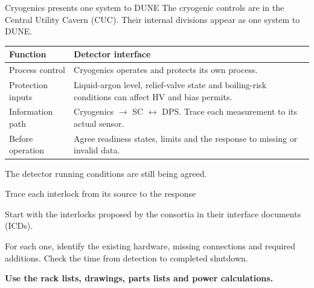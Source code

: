 \documentclass[aspectratio=169,11pt]{beamer}
\begin{document}
\DpsSdstaUpdate

\begin{frame}{Cryogenics presents one system to DUNE}
The cryogenic controls are in the Central Utility Cavern (CUC).
Their internal divisions appear as one system to DUNE.\par\bigskip
\renewcommand{\arraystretch}{1.3}
\begin{tabularx}{\textwidth}{@{}>{\RaggedRight\arraybackslash}p{3cm}>{\RaggedRight\arraybackslash}X@{}}
\toprule
\textbf{Function} & \textbf{Detector interface}\\\midrule
Process control & Cryogenics operates and protects its own process.\\
Protection inputs & Liquid-argon level, relief-valve state and boiling-risk conditions can affect HV and bias permits.\\
Information path & Cryogenics $\rightarrow$ SC $\leftrightarrow$ DPS. Trace each measurement to its actual sensor.\\
Before operation & Agree readiness states, limits and the response to missing or invalid data.\\
\bottomrule
\end{tabularx}\par\medskip
The detector running conditions are still being agreed.
\end{frame}

\begin{frame}{Trace each interlock from its source to the response}
\centering
{}\par\smallskip
\raggedright{}\par\smallskip
\raggedright

Start with the interlocks proposed by the consortia in their interface documents (ICDs).\par\bigskip
For each one, identify the existing hardware, missing connections and required additions. Check the time from detection to completed shutdown.\par\bigskip
\textbf{Use the rack lists, drawings, parts lists and power calculations.}
\end{frame}
\end{document}
